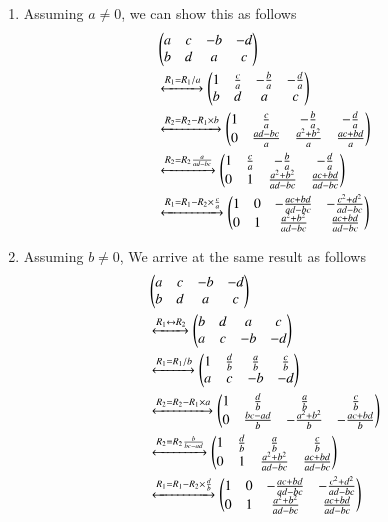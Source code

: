 \documentclass[journal,12pt,twocolumn]{IEEEtran}
\begin{document}
\begin{enumerate}
    \item Assuming $a \neq 0$, we can show this as follows
    \begin{align}
        &\begin{pmatrix}a & c & -b & -d \\ b & d & a & c\end{pmatrix}  \nonumber \\
        &\xleftrightarrow{R_1 = R_1/a} \begin{pmatrix}1 & \frac{c}{a} & -\frac{b}{a} & -\frac{d}{a} \\ b & d & a & c\end{pmatrix} \nonumber \\
&\xleftrightarrow{R_2 = R_2 - R_1\times b} \begin{pmatrix}1 & \frac{c}{a} & -\frac{b}{a} & -\frac{d}{a} \\ 0 & \frac{ad-bc}{a} & \frac{a^2+b^2}{a} & \frac{ac+bd}{a}\end{pmatrix} \nonumber \\
&\xleftrightarrow{R_2 = R_2\frac{a}{ad-bc}} \begin{pmatrix}1 & \frac{c}{a} & -\frac{b}{a} & -\frac{d}{a} \\ 0 & 1 & \frac{a^2+b^2}{ad-bc} & \frac{ac+bd}{ad-bc}\end{pmatrix} \nonumber \\
&\xleftrightarrow{R_1 = R_1 - R_2\times\frac{c}{a}} \begin{pmatrix}1 & 0 & -\frac{ac+bd}{ad-bc} & -\frac{c^2+d^2}{ad-bc} \\ 0 & 1 & \frac{a^2+b^2}{ad-bc} & \frac{ac+bd}{ad-bc}\end{pmatrix} \nonumber
    \end{align}
\item Assuming $b \neq 0$, We arrive at the same result as follows
\begin{align}
    &\begin{pmatrix}a & c & -b & -d \\ b & d & a & c\end{pmatrix} \nonumber \\ 
    &\xleftrightarrow{R_1\leftrightarrow R_2} \begin{pmatrix} b & d & a & c \\ a & c & -b & -d \end{pmatrix} \nonumber \\
&\xleftrightarrow{R_1 = R_1/b}   \begin{pmatrix} 1 & \frac{d}{b} & \frac{a}{b} & \frac{c}{b} \\ a & c & -b & -d \end{pmatrix} \nonumber \\
&\xleftrightarrow{R_2 = R_2 - R_1\times a} \begin{pmatrix} 1 & \frac{d}{b} & \frac{a}{b} & \frac{c}{b} \\ 0 & \frac{bc-ad}{b} & -\frac{a^2+b^2}{b} & -\frac{ac+bd}{b}\end{pmatrix} \nonumber \\
&\xleftrightarrow{R_2 = R_2\frac{b}{bc-ad}} \begin{pmatrix} 1 & \frac{d}{b} & \frac{a}{b} & \frac{c}{b} \\ 0 & 1 & \frac{a^2+b^2}{ad-bc} & \frac{ac+bd}{ad-bc}\end{pmatrix} \nonumber \\
&\xleftrightarrow{R_1 = R_1 - R_2\times\frac{d}{b}} \begin{pmatrix}1 & 0 & -\frac{ac+bd}{ad-bc} & -\frac{c^2+d^2}{ad-bc} \\ 0 & 1 & \frac{a^2+b^2}{ad-bc} & \frac{ac+bd}{ad-bc}\end{pmatrix} \nonumber
\end{align}
\end{enumerate}
\end{document}
